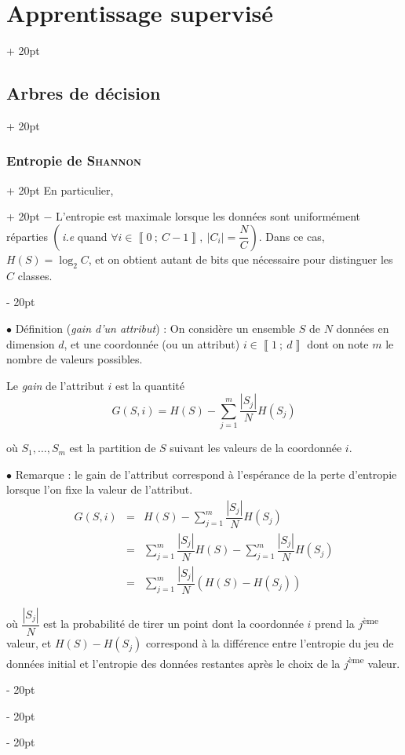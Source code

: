 \documentclass[a4paper, 12pt, twoside]{article}
\newcommand{\nset}[2]{\left\llbracket #1\ ;\ #2 \right\rrbracket}
\newcommand{\abs}[1]{\left\lvert #1 \right\rvert}
\newcommand{\ind}[1][20pt]{\advance\leftskip + #1}
\newcommand{\deind}[1][20pt]{\advance\leftskip - #1}
\newenvironment{indt}[2][20pt]{#2 \par \ind[#1]}{\par \deind} %
\begin{document}
\begin{indt}{\section{Apprentissage supervisé}}
\begin{indt}{\subsection{Arbres de décision}}
\begin{indt}{\subsubsection{Entropie de \textsc{Shannon}}}
\begin{indt}{En particulier,}
                    $-$ L'entropie est maximale lorsque les données sont uniformément réparties $\left(\vphantom{\dfrac N C} \right.$\textit{i.e} quand $\left. \forall i \in \nset 0 {C - 1},\ \abs{C_i} = \dfrac N C \right)$.
                    Dans ce cas, $H(S) = \log_2 C$, et on obtient autant de bits que nécessaire pour distinguer les $C$ classes.
                \end{indt}

                \vspace{12pt}
                
                $\bullet$ Définition (\textit{gain d'un attribut}) :
                On considère un ensemble $S$ de $N$ données en dimension $d$, et une coordonnée (ou un attribut) $i \in \nset 1 d$ dont on note $m$ le nombre de valeurs possibles.

                Le \emph{gain} de l'attribut $i$ est la quantité
                \[
                    G(S, i) = H(S) - \sum_{j = 1}^m \dfrac{\abs{S_j}}{N} H(S_j)
                \]

                où $S_1, \ldots, S_m$ est la partition de $S$ suivant les valeurs de la coordonnée $i$.

                \vspace{12pt}
                
                $\bullet$ Remarque : le gain de l'attribut correspond à l'espérance de la perte d'entropie lorsque l'on fixe la valeur de l'attribut.
                \[
                    \begin{array}{rcl}
                        G(S, i)
                        &=& \displaystyle
                        H(S) - \sum_{j = 1}^m \dfrac{\abs{S_j}}{N} H(S_j)
                        \\
                        &=& \displaystyle
                        \sum_{j = 1}^m \dfrac{\abs{S_j}}{N} H(S)
                        - \sum_{j = 1}^m \dfrac{\abs{S_j}}{N} H(S_j)
                        \\
                        &=& \displaystyle
                        \sum_{j = 1}^m \dfrac{\abs{S_j}}{N} (H(S) - H(S_j))
                    \end{array}
                \]

                où $\dfrac{\abs{S_j}} N$ est la probabilité de tirer un point dont la coordonnée $i$ prend la $j$\textsuperscript{ème} valeur, et $H(S) - H(S_j)$ correspond à la différence entre l'entropie du jeu de données initial et l'entropie des données restantes après le choix de la $j$\textsuperscript{ème} valeur.


\end{indt}
\end{indt}
\end{indt}
\end{document}
